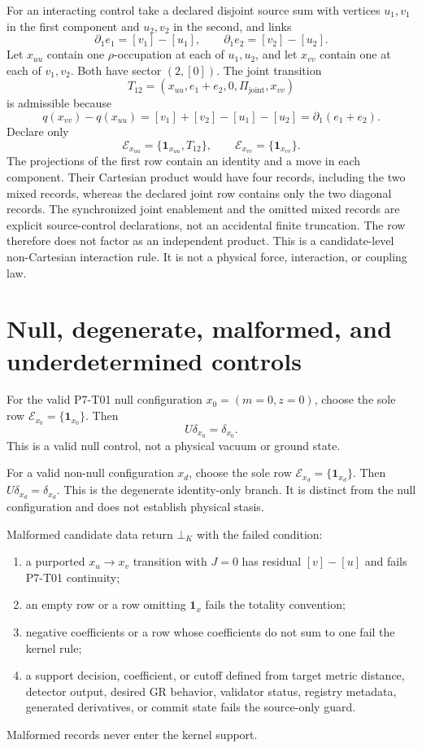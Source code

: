 \documentclass[11pt]{article}
\newcommand{\Enabled}{\mathcal E}
\newcommand{\Malformed}{\bot_K}
\begin{document}
For an interacting control take a declared disjoint source sum with vertices
\(u_1,v_1\) in the first component and \(u_2,v_2\) in the second, and links
\[
  \partial_1e_1=[v_1]-[u_1],
  \qquad
  \partial_1e_2=[v_2]-[u_2].
\]
Let \(x_{uu}\) contain one \(\rho\)-occupation at each of \(u_1,u_2\), and let
\(x_{vv}\) contain one at each of \(v_1,v_2\). Both have sector
\((2,[0])\). The joint
transition
\[
  T_{12}=(x_{uu},e_1+e_2,0,\Pi_{\mathrm{joint}},x_{vv})
\]
is admissible because
\[
  q(x_{vv})-q(x_{uu})
  =
  [v_1]+[v_2]-[u_1]-[u_2]
  =
  \partial_1(e_1+e_2).
\]
Declare only
\[
  \Enabled_{x_{uu}}=\{\mathbf1_{x_{uu}},T_{12}\},
  \qquad
  \Enabled_{x_{vv}}=\{\mathbf1_{x_{vv}}\}.
\]
The projections of the first row contain an identity and a move in each
component. Their Cartesian product would have four records, including the two
mixed records, whereas the declared joint row contains only the two diagonal
records. The synchronized joint enablement and the omitted mixed records are
explicit source-control declarations, not an accidental finite truncation.
The row therefore does not factor as an independent product. This is a
candidate-level non-Cartesian interaction rule. It is not a physical force,
interaction, or coupling law.

\section{Null, degenerate, malformed, and underdetermined controls}

For the valid P7-T01 null configuration
\(x_0=(m=0,z=0)\), choose the sole row
\(\Enabled_{x_0}=\{\mathbf1_{x_0}\}\). Then
\[
  U\delta_{x_0}=\delta_{x_0}.
\]
This is a valid null control, not a physical vacuum or ground state.

For a valid non-null configuration \(x_d\), choose the sole row
\(\Enabled_{x_d}=\{\mathbf1_{x_d}\}\). Then
\(U\delta_{x_d}=\delta_{x_d}\). This is the degenerate identity-only branch.
It is distinct from the null configuration and does not establish physical
stasis.

Malformed candidate data return \(\Malformed\) with the failed condition:
\begin{enumerate}[leftmargin=*]
\item a purported \(x_u\to x_v\) transition with \(J=0\) has residual
  \([v]-[u]\) and fails P7-T01 continuity;
\item an empty row or a row omitting \(\mathbf1_x\) fails the totality
  convention;
\item negative coefficients or a row whose coefficients do not sum to one
  fail the kernel rule;
\item a support decision, coefficient, or cutoff defined from target metric
  distance, detector output, desired GR behavior, validator status, registry
  metadata, generated derivatives, or commit state fails the source-only
  guard.
\end{enumerate}
Malformed records never enter the kernel support.
\end{document}
